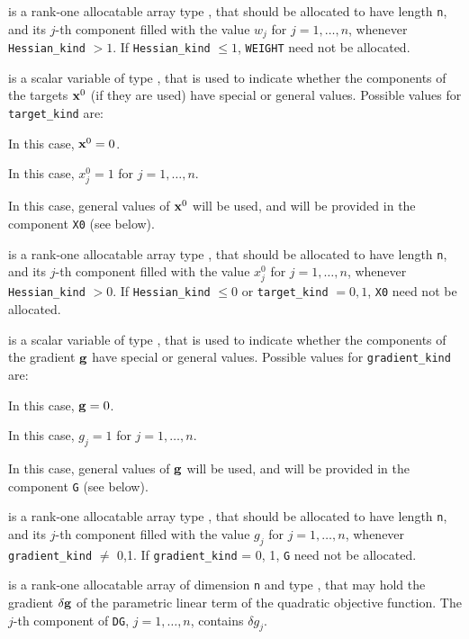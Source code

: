 \documentclass{galahad}
\begin{document}
\begin{description}
 is a rank-one allocatable array type \realdp, that 
should be allocated to have length {\tt n}, and its $j$-th component 
filled with the value $w_{j}$ for $j = 1, \ldots , n$, 
whenever {\tt Hessian\_kind} $>1$.
If {\tt Hessian\_kind} $\leq 1$, {\tt WEIGHT} need not be allocated.

 is a scalar variable of type \integer, 
that is used to indicate whether the components of the targets ${\mathbf{x}}^0$ 
(if they are used) have special or general values. Possible values for 
{\tt target\_kind} are:
\begin{description}
  In this case, ${\mathbf{x}}^0 = 0$.

 In this case, $x^0_{j} = 1$ for $j = 1, \ldots , n$.

 In this case, general values of ${\mathbf{x}}^0$ will be used,
     and will be provided in the component {\tt X0} (see below).
\end{description}

 is a rank-one allocatable array type \realdp, that 
should be allocated to have length {\tt n}, and its $j$-th component 
filled with the value $x_{j}^0$ for $j = 1, \ldots , n$, 
whenever {\tt Hessian\_kind} $>0$.
If {\tt Hessian\_kind} $\leq 0$  or {\tt target\_kind} $= 0,1$,
{\tt X0} need not be allocated.

 is a scalar variable of type \integer, 
that is used to indicate whether the components of the gradient ${\mathbf{g}}$ 
have special or general values. Possible values for {\tt gradient\_kind} are:
\begin{description}
  In this case, ${\mathbf{g}} = 0$.

 In this case, $g_{j} = 1$ for $j = 1, \ldots , n$.

 In this case, general values of ${\mathbf{g}}$ will be used,
     and will be provided in the component {\tt G} (see below).
\end{description}

 is a rank-one allocatable array type \realdp, that 
should be allocated to have length {\tt n}, and its $j$-th component 
filled with the value $g_{j}$ for $j = 1, \ldots , n$, 
whenever {\tt gradient\_kind} $\neq$ 0,1.
If {\tt gradient\_kind} {= 0, 1}, {\tt G} need not be allocated.

 is a rank-one allocatable array of dimension {\tt n} and type 
\realdp, that may hold the gradient $\delta {\mathbf{g}}$ 
of the parametric linear term of the quadratic objective function.
The $j$-th component of 
{\tt DG}, $j = 1,  \ldots ,  n$, contains $\delta g_{j}$.


\end{description}
\end{document}
